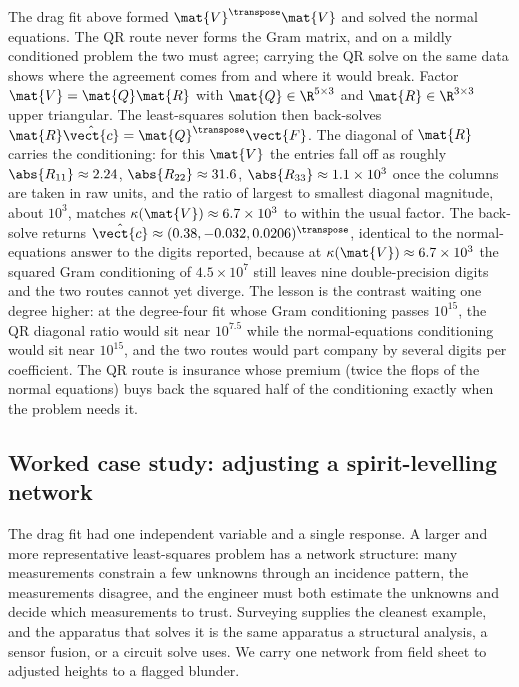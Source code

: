 \begin{example}
The drag fit above formed $\mat{V}^{\transpose}\mat{V}$ and solved the
normal equations. The QR route never forms the Gram matrix, and on a
mildly conditioned problem the two must agree; carrying the QR solve on
the same data shows where the agreement comes from and where it would
break. Factor $\mat{V} = \mat{Q}\mat{R}$ with $\mat{Q} \in \R^{5 \times
3}$ and $\mat{R} \in \R^{3 \times 3}$ upper triangular. The
least-squares solution then back-solves $\mat{R}\hat{\vect{c}} =
\mat{Q}^{\transpose}\vect{F}$. The diagonal of $\mat{R}$ carries the
conditioning: for this $\mat{V}$ the entries fall off as roughly
$\abs{R_{11}} \approx 2.24$, $\abs{R_{22}} \approx 31.6$, $\abs{R_{33}}
\approx 1.1 \times 10^{3}$ once the columns are taken in raw units, and
the ratio of largest to smallest diagonal magnitude, about $10^{3}$,
matches $\kappa(\mat{V}) \approx 6.7 \times 10^{3}$ to within the usual
factor. The back-solve returns $\hat{\vect{c}} \approx (0.38, -0.032,
0.0206)^{\transpose}$, identical to the normal-equations answer to the
digits reported, because at $\kappa(\mat{V}) \approx 6.7 \times 10^{3}$
the squared Gram conditioning of $4.5 \times 10^{7}$ still leaves nine
double-precision digits and the two routes cannot yet diverge. The
lesson is the contrast waiting one degree higher: at the degree-four
fit whose Gram conditioning passes $10^{15}$, the QR diagonal ratio
would sit near $10^{7.5}$ while the normal-equations conditioning would
sit near $10^{15}$, and the two routes would part company by several
digits per coefficient. The QR route is insurance whose premium (twice
the flops of the normal equations) buys back the squared half of the
conditioning exactly when the problem needs it.
\end{example}

\subsection{Worked case study: adjusting a spirit-levelling network}

The drag fit had one independent variable and a single response. A
larger and more representative least-squares problem has a network
structure: many measurements constrain a few unknowns through an
incidence pattern, the measurements disagree, and the engineer must
both estimate the unknowns and decide which measurements to trust.
Surveying supplies the cleanest example, and the apparatus that
solves it is the same apparatus a structural analysis, a sensor
fusion, or a circuit solve uses. We carry one network from field
sheet to adjusted heights to a flagged blunder.

